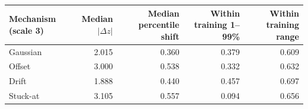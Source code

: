 \begin{tabular}{lrrrr}
\toprule
Mechanism (scale 3) & Median $|\Delta z|$ & Median percentile shift & Within training 1--99\% & Within training range \\
\midrule
Gaussian & 2.015 & 0.360 & 0.379 & 0.609 \\
Offset & 3.000 & 0.538 & 0.332 & 0.632 \\
Drift & 1.888 & 0.440 & 0.457 & 0.697 \\
Stuck-at & 3.105 & 0.557 & 0.094 & 0.656 \\
\bottomrule
\end{tabular}

